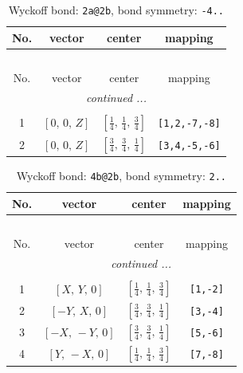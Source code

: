 \documentclass[fleqn,8pt]{jsarticle}
\begin{document}
\begin{longtable}{cccc}
\caption{Wyckoff bond: {\tt 2a@2b}, bond symmetry: {\tt -4..}}
 \\
 \hline \hline
No. & vector & center & mapping \\ \hline \endfirsthead

\multicolumn{3}{l}{\tablename\ \thetable{}} \\
 \hline \hline
No. & vector & center & mapping \\ \hline \endhead

 \hline \hline
\multicolumn{3}{r}{\footnotesize\it continued ...} \\ \endfoot

 \hline \hline
\multicolumn{3}{r}{} \\ \endlastfoot

1 & $\left[ 0,\, 0,\, Z \right]$ & $\left[ \frac{1}{4},\, \frac{1}{4},\, \frac{3}{4} \right]$ & {\tt [1,2,-7,-8]} \\ \hline
2 & $\left[ 0,\, 0,\, Z \right]$ & $\left[ \frac{3}{4},\, \frac{3}{4},\, \frac{1}{4} \right]$ & {\tt [3,4,-5,-6]} \\
\end{longtable}
\renewcommand{\arraystretch}{1.2}
\begin{longtable}{cccc}
\caption{Wyckoff bond: {\tt 4b@2b}, bond symmetry: {\tt 2..}}
 \\
 \hline \hline
No. & vector & center & mapping \\ \hline \endfirsthead

\multicolumn{3}{l}{\tablename\ \thetable{}} \\
 \hline \hline
No. & vector & center & mapping \\ \hline \endhead

 \hline \hline
\multicolumn{3}{r}{\footnotesize\it continued ...} \\ \endfoot

 \hline \hline
\multicolumn{3}{r}{} \\ \endlastfoot

1 & $\left[ X,\, Y,\, 0 \right]$ & $\left[ \frac{1}{4},\, \frac{1}{4},\, \frac{3}{4} \right]$ & {\tt [1,-2]} \\ \hline
2 & $\left[ - Y,\, X,\, 0 \right]$ & $\left[ \frac{3}{4},\, \frac{3}{4},\, \frac{1}{4} \right]$ & {\tt [3,-4]} \\ \hline
3 & $\left[ - X,\, - Y,\, 0 \right]$ & $\left[ \frac{3}{4},\, \frac{3}{4},\, \frac{1}{4} \right]$ & {\tt [5,-6]} \\ \hline
4 & $\left[ Y,\, - X,\, 0 \right]$ & $\left[ \frac{1}{4},\, \frac{1}{4},\, \frac{3}{4} \right]$ & {\tt [7,-8]} \\
\end{longtable}
\end{document}
